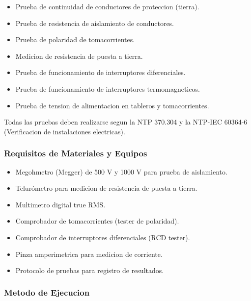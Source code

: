 \begin{itemize}
  \item Prueba de continuidad de conductores de proteccion (tierra).
  \item Prueba de resistencia de aislamiento de conductores.
  \item Prueba de polaridad de tomacorrientes.
  \item Medicion de resistencia de puesta a tierra.
  \item Prueba de funcionamiento de interruptores diferenciales.
  \item Prueba de funcionamiento de interruptores termomagneticos.
  \item Prueba de tension de alimentacion en tableros y tomacorrientes.
\end{itemize}

Todas las pruebas deben realizarse segun la NTP 370.304 y la NTP-IEC 60364-6 (Verificacion de instalaciones electricas).

\subsubsection{Requisitos de Materiales y Equipos}

\begin{itemize}
  \item Megohmetro (Megger) de 500 V y 1000 V para prueba de aislamiento.
  \item Telurómetro para medicion de resistencia de puesta a tierra.
  \item Multimetro digital true RMS.
  \item Comprobador de tomacorrientes (tester de polaridad).
  \item Comprobador de interruptores diferenciales (RCD tester).
  \item Pinza amperimetrica para medicion de corriente.
  \item Protocolo de pruebas para registro de resultados.
\end{itemize}

\subsubsection{Metodo de Ejecucion}

